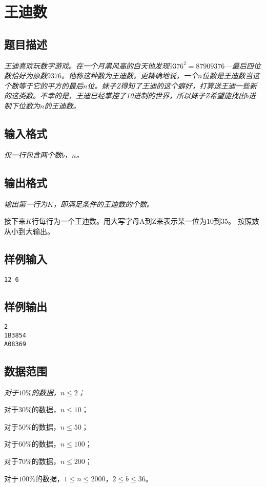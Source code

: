 \section{王迪数}
\subsection{题目描述}
{
\itshape
	王迪喜欢玩数字游戏。在一个月黑风高的白天他发现$9376^2 = 87909376$---最后四位数恰好为原数$9376$。他称这种数为王迪数。更精确地说，一个$n$位数是王迪数当这个数等于它的平方的最后$n$位。妹子Z得知了王迪的这个癖好，打算送王迪一些新的这类数。不幸的是，王迪已经掌控了10进制的世界，所以妹子Z希望能找出$b$进制下位数为$n$的王迪数。
}

\subsection{输入格式}
{\itshape
	仅一行包含两个数$b$，$n$。
}
\subsection{输出格式}
{\itshape
	输出第一行为$K$，即满足条件的王迪数的个数。
\par 接下来$K$行每行为一个王迪数。用大写字母A到Z来表示某一位为$10$到$35$。
按照数从小到大输出。
}
\subsection{样例输入}
\begin{verbatim}
12 6
\end{verbatim}
\subsection{样例输出}
\begin{verbatim}
2
1B3854
A08369
\end{verbatim}
\subsection{数据范围}
{\itshape
 对于$10\%$的数据，$n \le 2$；
\par 对于$30\%$的数据，$n \le 10$；
\par 对于$50\%$的数据，$n \le 50$；
\par 对于$60\%$的数据，$n \le 100$；
\par 对于$70\%$的数据，$n \le 200$；
\par 对于$100\%$的数据，$1 \le n \le 2000$，$2 \le b \le 36$。
}
